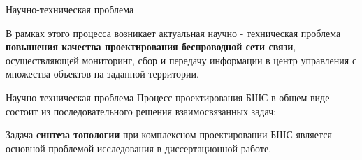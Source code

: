 
\begin{frame}
    {Научно-техническая проблема}
    \justifying

    В рамках этого процесса возникает актуальная научно - техническая проблема \textbf{повышения качества проектирования беспроводной сети связи}, осуществляющей мониторинг, сбор и передачу информации в центр управления с множества объектов на заданной территории.  
 

\end{frame}


\begin{frame}
    {Научно-техническая проблема}
    Процесс проектирования БШС в общем виде состоит из последовательного решения взаимосвязанных задач:
    
    \bigskip

        



    \bigskip
    
    Задача \textbf{синтеза топологии} при комплексном проектировании БШС является основной проблемой исследования в диссертационной работе.

\end{frame}

